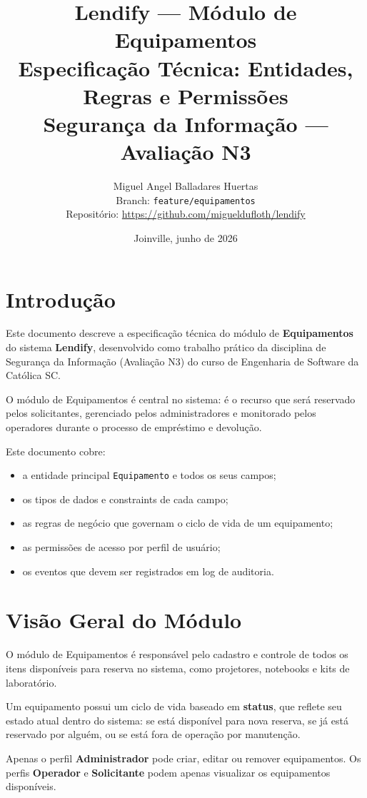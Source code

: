 \documentclass[12pt,a4paper]{article}
\title{
    \textbf{Lendify — Módulo de Equipamentos} \\
    \large Especificação Técnica: Entidades, Regras e Permissões \\
    \normalsize Segurança da Informação — Avaliação N3
}
\author{
    Miguel Angel Balladares Huertas \\
    \small Branch: \texttt{feature/equipamentos} \\
    \small Repositório: \url{https://github.com/migueldufloth/lendify}
}
\date{Joinville, junho de 2026}
\begin{document}
\maketitle
\tableofcontents
\newpage

\section{Introdução}

Este documento descreve a especificação técnica do módulo de \textbf{Equipamentos} do
sistema \textbf{Lendify}, desenvolvido como trabalho prático da disciplina de Segurança
da Informação (Avaliação N3) do curso de Engenharia de Software da Católica SC.

O módulo de Equipamentos é central no sistema: é o recurso que será reservado pelos
solicitantes, gerenciado pelos administradores e monitorado pelos operadores durante o
processo de empréstimo e devolução.

Este documento cobre:
\begin{itemize}
  \item a entidade principal \texttt{Equipamento} e todos os seus campos;
  \item os tipos de dados e constraints de cada campo;
  \item as regras de negócio que governam o ciclo de vida de um equipamento;
  \item as permissões de acesso por perfil de usuário;
  \item os eventos que devem ser registrados em log de auditoria.
\end{itemize}

\section{Visão Geral do Módulo}

O módulo de Equipamentos é responsável pelo cadastro e controle de todos os itens
disponíveis para reserva no sistema, como projetores, notebooks e kits de laboratório.

Um equipamento possui um ciclo de vida baseado em \textbf{status}, que reflete seu estado
atual dentro do sistema: se está disponível para nova reserva, se já está reservado por
alguém, ou se está fora de operação por manutenção.

Apenas o perfil \textbf{Administrador} pode criar, editar ou remover equipamentos.
Os perfis \textbf{Operador} e \textbf{Solicitante} podem apenas visualizar os equipamentos
disponíveis.
\end{document}
